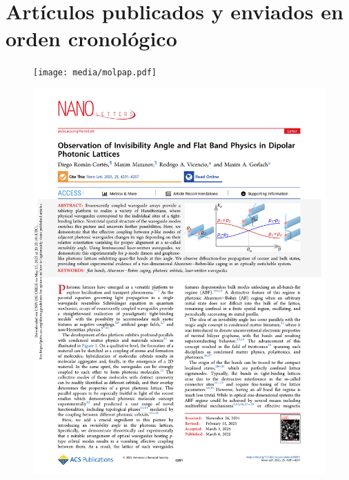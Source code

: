 \chapter{Artículos publicados y enviados en orden cronológico}

\begin{figure}[H]
	\centering
	\texttt{[image: media/molpap.pdf]}
\end{figure}
\newpage
\begin{figure}[H]
	\centering
	\includegraphics[page=1, width=\linewidth]{media/dipolepap.pdf}
\end{figure}
\newpage
